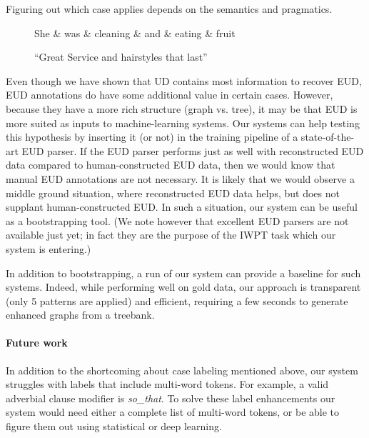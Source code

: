 \documentclass[11pt,a4paper]{article}
\begin{document}
\begin{itemize}
  Figuring out which case applies depends on the semantics and
  pragmatics.
\begin{figure}[h]
    \centering
    \begin{dependency}
    \begin{deptext}[column sep=0.1cm]
    She \& was \& cleaning \& and \& eating \& fruit  \\
    \end{deptext}
    \end{dependency}
    \caption{``Great Service and hairstyles that last''}
    \label{fig:conj-obj}
\end{figure}
 

\end{itemize}

Even though we have shown that UD contains most information to recover
EUD, EUD annotations do have some additional value in certain
cases. However, because they have a more rich structure (graph
vs. tree), it may be that EUD is more suited as inputs to
machine-learning systems. Our systems can help testing this hypothesis
by inserting it (or not) in the training pipeline of a state-of-the-art EUD
parser. If the EUD parser performs just as well with reconstructed EUD
data compared to human-constructed EUD data, then we would know that
manual EUD annotations are not necessary.  It is likely that we would observe
a middle ground situation, where reconstructed EUD data helps, but
does not supplant human-constructed EUD. In such a situation, our
system can be useful as a bootstrapping tool. (We note however that
excellent EUD parsers are not available just yet; in fact they are the
purpose of the IWPT task which our system is entering.)

In addition to bootstrapping, a run of our system can provide a
baseline for such systems.  Indeed, while performing well on gold
data, our approach is transparent (only 5 patterns are applied) and
efficient, requiring a few seconds to generate enhanced graphs from a
treebank.

\paragraph{ Future work }

In addition to the shortcoming about case labeling mentioned above,
our system struggles with labels that include multi-word tokens. For
example, a valid adverbial clause modifier is \textit{so\_that}. To
solve these label enhancements our system would need either a complete
list of multi-word tokens, or be able to figure them out using
statistical or deep learning.
\end{document}
